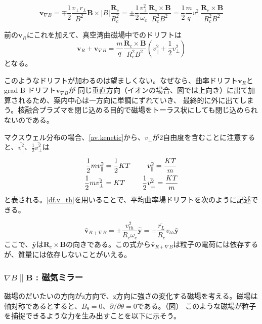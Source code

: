 \documentclass{ltjsarticle}
\numberwithin{equation}{section} %
\begin{document}
\begin{equation}
  \bm{v}_{\nabla B} = \mp \frac{1}{2}\frac{v_\perp r_L}{B^2}\bm{B}\times |B| \frac{\bm{R}_c}{R_c ^2} = \pm \frac{1}{2} \frac{v_\perp ^2}{\omega_c}\frac{\bm{R}_c \times \bm{B}}{R_c ^2B^2} = \frac{1}{2}\frac{m}{q}v_\perp ^2 \frac{\bm{R}_c \times \bm{B}}{R_c ^2 B^2}
\end{equation}

前の$\bm{v}_R$にこれを加えて、真空湾曲磁場中でのドリフトは
\begin{equation}
  \boxed{\bm{v}_R + \bm{v}_{\nabla B} = \frac{m}{q} \frac{\bm{R}_c \times \bm{B}}{R_c ^2 B^2}\left(v_\parallel ^2 + \frac{1}{2}v_\perp ^2\right)}
\end{equation}
となる。

このようなドリフトが加わるのは望ましくない。なぜなら、曲率ドリフト$\bm{v}_R$とgrad B ドリフト$\bm{v}_{\nabla B}$が 同じ垂直方向（イオンの場合、図では上向き）に出て加算されるため、案内中心は一方向に単調にずれていき、
最終的に外に出てしまう。核融合プラズマを閉じ込める目的で磁場をトーラス状にしても閉じ込められないのである。

 マクスウェル分布の場合、\eqref{av.kenetic}から、$v_\perp$が2自由度を含むことに注意すると、$\bar{v_\parallel ^2}$、$\frac{1}{2}\bar{v_\perp ^2}$は
 \begin{align*}
  \frac{1}{2}m\bar{v_\parallel ^2} &= \frac{1}{2}KT \hspace{2pc} \bar{v_\parallel ^2} = \frac{KT}{m}\\
  \frac{1}{2}m\bar{v_\perp ^2} &= KT \hspace{2pc} \frac{1}{2}\bar{v_\perp ^2} = \frac{KT}{m}
 \end{align*}
と表される。\eqref{df.v_th}を用いることで、平均曲率場ドリフトを次のように記述できる。

\addtocounter{equation}{-1}%
\begin{subequations}
  \begin{equation}\label{eq:230a}
    \bar{\bm{v}}_{R+\nabla B} = \pm \frac{v_{th}^2}{R_c \omega_c}\hat{\bm{y}} = \pm \frac{\bar{r_L}}{R_c}v_{th} \bar{\bm{y}}
  \end{equation}
\end{subequations}
ここで、$\bar{\bm{y}}$は$\bm{R}_c \times \bm{B}$の向きである。この式から$\bar{\bm{v}}_{R+\nabla B}$は粒子の電荷には依存するが、質量には依存しないことがいえる。

\subsubsection{$\nabla B \parallel \bm{B}$ : 磁気ミラー}
磁場のだいたいの方向がz方向で、z方向に強さの変化する磁場を考える。磁場は軸対称であるとすると、$B_\theta = 0$、$\partial/\partial \theta = 0$である。（図）
このような磁場が粒子を捕捉できるような力を生み出すことを以下に示そう。
\end{document}
